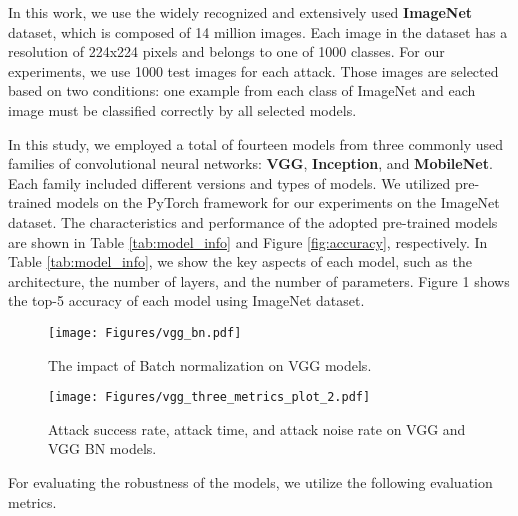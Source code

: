In this work, we use the widely recognized and extensively used \textbf{ImageNet} dataset, which is composed of 14 million images. Each image in the dataset has a resolution of 224x224 pixels and belongs to one of 1000 classes.
For our experiments, we use 1000 test images for each attack. Those images are selected based on two conditions:  one example from each class of ImageNet and  each image must be classified correctly by all selected models.

In this study, we employed a total of fourteen models from three commonly used families of convolutional neural networks: \textbf{VGG}, \textbf{Inception}, and \textbf{MobileNet}. Each family included different versions and types of models. We utilized pre-trained models on the PyTorch framework for our experiments on the ImageNet dataset.  
The characteristics and performance of the adopted pre-trained models are shown in Table \ref{tab:model_info} and Figure \ref{fig:accuracy}, respectively. 
In Table \ref{tab:model_info}, we show the key aspects of each model, such as the architecture, the number of layers, and the number of parameters. 
Figure 1 shows the top-5 accuracy of each model using ImageNet dataset. 




\begin{figure*}[t]
    \centering
    \texttt{[image: Figures/vgg\_bn.pdf]}
    \caption{The impact of Batch normalization on VGG models.}
    \label{fig:vgg_bn} 
\end{figure*}
\begin{figure*}[t]
    \centering
    \texttt{[image: Figures/vgg\_three\_metrics\_plot\_2.pdf]}
    \caption{Attack success rate, attack time, and attack noise rate on VGG and VGG BN models.}
    \label{fig:vgg_three_metrics} 
\end{figure*} 

For evaluating the robustness of the models, we utilize the following evaluation metrics. 


